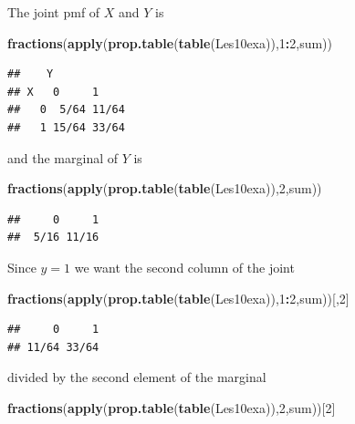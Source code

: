 \documentclass[]{book}
\newenvironment{Shaded}{\begin{snugshade}}{\end{snugshade}}
\newcommand{\KeywordTok}[1]{\textcolor[rgb]{0.13,0.29,0.53}{\textbf{#1}}}
\newcommand{\DecValTok}[1]{\textcolor[rgb]{0.00,0.00,0.81}{#1}}
\newcommand{\OperatorTok}[1]{\textcolor[rgb]{0.81,0.36,0.00}{\textbf{#1}}}
\newcommand{\NormalTok}[1]{#1}
\theoremstyle{definition}
\theoremstyle{definition}
\theoremstyle{definition}
\theoremstyle{remark}
\begin{document}
The joint pmf of \(X\) and \(Y\) is

\begin{Shaded}
\begin{Highlighting}[]
\KeywordTok{fractions}\NormalTok{(}\KeywordTok{apply}\NormalTok{(}\KeywordTok{prop.table}\NormalTok{(}\KeywordTok{table}\NormalTok{(Les10exa)),}\DecValTok{1}\OperatorTok{:}\DecValTok{2}\NormalTok{,sum))}
\end{Highlighting}
\end{Shaded}

\begin{verbatim}
##    Y
## X   0     1    
##   0  5/64 11/64
##   1 15/64 33/64
\end{verbatim}

and the marginal of \(Y\) is

\begin{Shaded}
\begin{Highlighting}[]
\KeywordTok{fractions}\NormalTok{(}\KeywordTok{apply}\NormalTok{(}\KeywordTok{prop.table}\NormalTok{(}\KeywordTok{table}\NormalTok{(Les10exa)),}\DecValTok{2}\NormalTok{,sum))}
\end{Highlighting}
\end{Shaded}

\begin{verbatim}
##     0     1 
##  5/16 11/16
\end{verbatim}

Since \(y=1\) we want the second column of the joint

\begin{Shaded}
\begin{Highlighting}[]
\KeywordTok{fractions}\NormalTok{(}\KeywordTok{apply}\NormalTok{(}\KeywordTok{prop.table}\NormalTok{(}\KeywordTok{table}\NormalTok{(Les10exa)),}\DecValTok{1}\OperatorTok{:}\DecValTok{2}\NormalTok{,sum))[,}\DecValTok{2}\NormalTok{]}
\end{Highlighting}
\end{Shaded}

\begin{verbatim}
##     0     1 
## 11/64 33/64
\end{verbatim}

divided by the second element of the marginal

\begin{Shaded}
\begin{Highlighting}[]
\KeywordTok{fractions}\NormalTok{(}\KeywordTok{apply}\NormalTok{(}\KeywordTok{prop.table}\NormalTok{(}\KeywordTok{table}\NormalTok{(Les10exa)),}\DecValTok{2}\NormalTok{,sum))[}\DecValTok{2}\NormalTok{]}
\end{Highlighting}
\end{Shaded}
\end{document}
